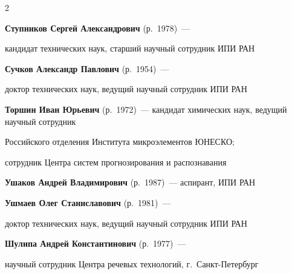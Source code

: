 \begin{multicols}{2}
\noindent

\textbf{Ступников  Сергей Александрович}  (р.\ 1978)~--- 

кандидат технических  наук, старший научный сотрудник ИПИ РАН



\vspace*{6pt}



\noindent

\textbf{Сучков Александр Павлович} (р.\ 1954)~--- 

доктор технических наук, ведущий научный сотрудник ИПИ РАН





\vspace*{6pt}



\noindent

\textbf{Торшин Иван Юрьевич} (р.\ 1972)~--- кандидат химических наук, ведущий научный сотрудник 

Российского отделения Института микроэлементов \mbox{ЮНЕСКО}; 

сотрудник Центра систем прог\-но\-зи\-ро\-вания и распознавания





\vspace*{6pt}



\noindent

\textbf{Ушаков Андрей Владимирович} (р.\ 1987)~--- аспирант, ИПИ РАН



\vspace*{6pt}



\noindent

\textbf{Ушмаев Олег Станиславович} (р.\ 1981)~--- 

доктор технических наук, ведущий научный сотрудник ИПИ РАН 



\vspace*{6pt}



\noindent

\textbf{Шулипа Андрей Константинович} (р.\ 1977)~--- 

научный сотрудник Центра речевых технологий, г.~Санкт-Пе\-тер\-бург



\end{multicols}



\newpage


